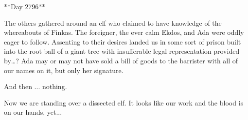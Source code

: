**Day 2796**

The others gathered around an elf who claimed to have knowledge of the whereabouts of Finkas.  The foreigner, the ever calm Ekdos, and Ada were oddly eager to follow.  Assenting to their desires landed us in some sort of prison built into the root ball of a giant tree with  insufferable legal representation provided by…?  Ada may or may not have sold a bill of goods to the barrister with all of our names on it, but only her signature.

And then ... nothing.

Now we are standing over a dissected elf.  It looks like our work and the blood is on our hands, yet...
